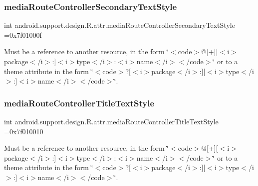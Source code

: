 \subsubsection{\texorpdfstring{media\+Route\+Controller\+Secondary\+Text\+Style}{mediaRouteControllerSecondaryTextStyle}}
{\footnotesize\ttfamily int android.\+support.\+design.\+R.\+attr.\+media\+Route\+Controller\+Secondary\+Text\+Style =0x7f01000f\hspace{0.3cm}{\ttfamily [static]}}

Must be a reference to another resource, in the form \char`\"{}$<$code$>$@\mbox{[}+\mbox{]}\mbox{[}$<$i$>$package$<$/i$>$\+:\mbox{]}$<$i$>$type$<$/i$>$\+:$<$i$>$name$<$/i$>$$<$/code$>$\char`\"{} or to a theme attribute in the form \char`\"{}$<$code$>$?\mbox{[}$<$i$>$package$<$/i$>$\+:\mbox{]}\mbox{[}$<$i$>$type$<$/i$>$\+:\mbox{]}$<$i$>$name$<$/i$>$$<$/code$>$\char`\"{}. \mbox{\label{classandroid_1_1support_1_1design_1_1R_1_1attr_a89cd18b286db9612053328d3ed645da6}} 
\subsubsection{\texorpdfstring{media\+Route\+Controller\+Title\+Text\+Style}{mediaRouteControllerTitleTextStyle}}
{\footnotesize\ttfamily int android.\+support.\+design.\+R.\+attr.\+media\+Route\+Controller\+Title\+Text\+Style =0x7f010010\hspace{0.3cm}{\ttfamily [static]}}

Must be a reference to another resource, in the form \char`\"{}$<$code$>$@\mbox{[}+\mbox{]}\mbox{[}$<$i$>$package$<$/i$>$\+:\mbox{]}$<$i$>$type$<$/i$>$\+:$<$i$>$name$<$/i$>$$<$/code$>$\char`\"{} or to a theme attribute in the form \char`\"{}$<$code$>$?\mbox{[}$<$i$>$package$<$/i$>$\+:\mbox{]}\mbox{[}$<$i$>$type$<$/i$>$\+:\mbox{]}$<$i$>$name$<$/i$>$$<$/code$>$\char`\"{}. \mbox{\label{classandroid_1_1support_1_1design_1_1R_1_1attr_a68258145838ffbb62f6d957439e41f55}} 

